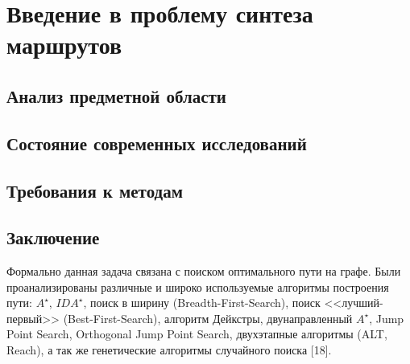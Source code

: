 \chapter{Введение в проблему синтеза маршрутов}
\section{Анализ предметной области}
\section{Состояние современных исследований}
\section{Требования к методам}
\section{Заключение}

Формально данная задача связана с поиском оптимального пути на графе. Были проанализированы различные и 
широко используемые алгоритмы построения пути: \( A^\star \), \( IDA^\star \), поиск в ширину 
(Breadth-First-Search), поиск <<лучший-первый>> (Best-First-Search), алгоритм Дейкстры, двунаправленный 
\( A^\star \), Jump Point Search, Orthogonal Jump Point Search, двухэтапные алгоритмы (ALT, Reach), а так 
же генетические алгоритмы случайного поиска [18]. 
